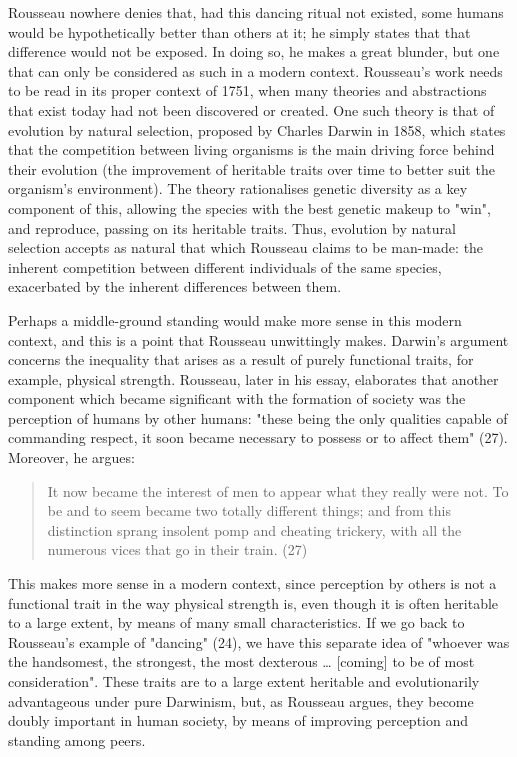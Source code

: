 Rousseau nowhere denies that, had this dancing ritual not existed, some humans would be hypothetically better than others at it; he simply states that that difference would not be exposed. In doing so, he makes a great blunder, but one that can only be considered as such in a modern context. Rousseau's work needs to be read in its proper context of 1751, when many theories and abstractions that exist today had not been discovered or created. One such theory is that of evolution by natural selection, proposed by Charles Darwin in 1858, which states that the competition between living organisms is the main driving force behind their evolution (the improvement of heritable traits over time to better suit the organism's environment). The theory rationalises genetic diversity as a key component of this, allowing the species with the best genetic makeup to "win", and reproduce, passing on its heritable traits. Thus, evolution by natural selection accepts as natural that which Rousseau claims to be man-made: the inherent competition between different individuals of the same species, exacerbated by the inherent differences between them.

Perhaps a middle-ground standing would make more sense in this modern context, and this is a point that Rousseau unwittingly makes. Darwin's argument concerns the inequality that arises as a result of purely functional traits, for example, physical strength. Rousseau, later in his essay, elaborates that another component which became significant with the formation of society was the perception of humans by other humans: "these being the only qualities capable of commanding respect, it soon became necessary to possess or to affect them" (27). Moreover, he argues:

\begin{quote}
  It now became the interest of men to appear what they really were not. To be and to seem became two totally different things; and from this distinction sprang insolent pomp and cheating trickery, with all the numerous vices that go in their train. (27)
\end{quote}

This makes more sense in a modern context, since perception by others is not a functional trait in the way physical strength is, even though it is often heritable to a large extent, by means of many small characteristics. If we go back to Rousseau's example of "dancing" (24), we have this separate idea of "whoever was the handsomest, the strongest, the most dexterous … [coming] to be of most consideration". These traits are to a large extent heritable and evolutionarily advantageous under pure Darwinism, but, as Rousseau argues, they become doubly important in human society, by means of improving perception and standing among peers.

